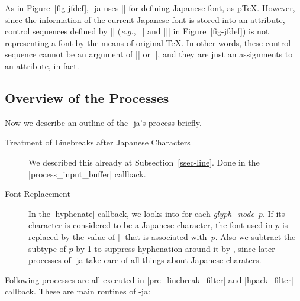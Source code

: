 \documentclass{ajt}
\begin{document}
As in Figure~\ref{fig-jfdef}, \LuaTeX-ja uses |\jfont| for defining
Japanese font, as p\TeX.  However, since the information of the current
Japanese font is stored into an attribute, control sequences defined by
|\jfont| (\emph{e.g.},~|\foo| and |\bar| in Figure~\ref{fig-jfdef}) is
not representing a font by the means of original \TeX. In other words,
these control sequence cannot be an argument of |\the| or |\textfont|, and they are just an assignments to an attribute, in fact.


\subsection{Overview of the Processes}
Now we describe an outline of the \LuaTeX-ja's process briefly.
\begin{description}
\item[Treatment of Linebreaks after Japanese Characters] We described
	   this already at Subsection~\ref{ssec-line}. Done in the
	   |process_input_buffer| callback.
\item[Font Replacement] In the |hyphenate| callback, we looks into for
	   each \textit{glyph\_node}~$p$. If its character is considered
	   to be a Japanese character, the font used in $p$ is replaced
	   by the value of |\ltj@curjfnt| that is associated
	   with~$p$. Also we subtract the subtype of $p$ by 1 to
	   suppress hyphenation around it by \LuaTeX, since later
	   processes of \LuaTeX-ja take care of all things about
	   Japanese charaters.
\end{description}
%
Following processes are all executed in |pre_linebreak_filter| and |hpack_filter| callback. These are main routines of \LuaTeX-ja:
\end{document}

